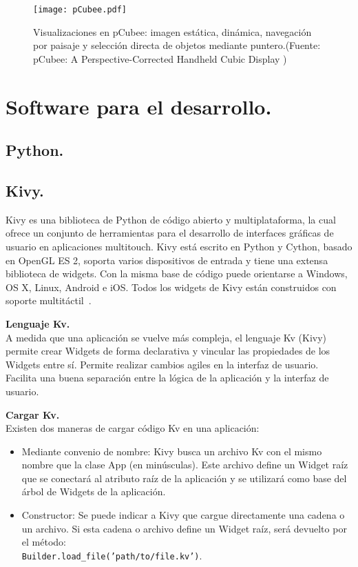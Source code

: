 \begin{figure}[!h]
\begin{center}
\texttt{[image: pCubee.pdf]}
\caption{Visualizaciones en pCubee: imagen estática, dinámica, navegación por paisaje y selección directa de objetos mediante puntero.(Fuente: pCubee: A Perspective-Corrected Handheld Cubic Display \cite{pCubee})}
\label{fig:pCubee}
\end{center}
\end{figure}


\section{Software para el desarrollo.}
\subsection{Python.}

\subsection{Kivy.}
Kivy es una biblioteca de Python de código abierto y multiplataforma, la cual ofrece un conjunto de herramientas para el desarrollo de interfaces gráficas de usuario en aplicaciones multitouch.
Kivy está escrito en Python y Cython, basado en OpenGL ES 2, soporta varios dispositivos de entrada y tiene una extensa biblioteca de widgets. Con la misma base de código puede orientarse a Windows, OS X, Linux, Android e iOS. Todos los widgets de Kivy están construidos con soporte multitáctil~\cite{Kivy}. 

\textbf{Lenguaje Kv.}\\
A medida que una aplicación se vuelve más compleja, el lenguaje Kv (Kivy) permite crear Widgets de forma declarativa y vincular las propiedades de los Widgets entre sí. Permite realizar cambios agiles en la interfaz de usuario. Facilita una buena separación entre la lógica de la aplicación y la interfaz de usuario.

\textbf{Cargar Kv.}\\
Existen dos maneras de cargar código Kv en una aplicación:
\begin{itemize}
\item Mediante convenio de nombre:
Kivy busca un archivo Kv con el mismo nombre que la clase App (en minúsculas). Este archivo define un Widget raíz que se conectará al atributo raíz de la aplicación y se utilizará como base del árbol de Widgets de la aplicación.
\item Constructor: Se puede indicar a Kivy que cargue directamente una cadena o un archivo. Si esta cadena o archivo define un Widget raíz, será devuelto por el método:\\
\texttt{Builder.load\_file('path/to/file.kv')}.\\
\end{itemize}

